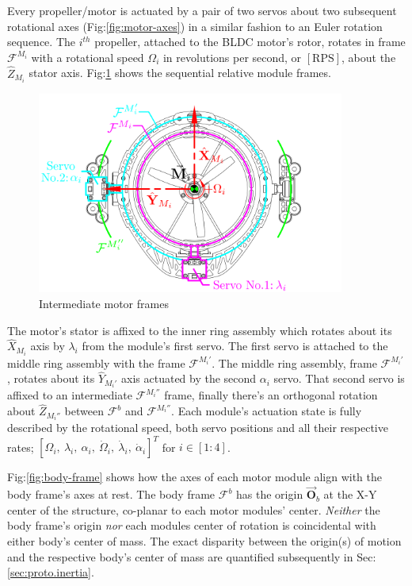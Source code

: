 Every propeller/motor is actuated by a pair of two servos about two subsequent rotational axes (Fig:\ref{fig:motor-axes}) in a similar fashion to an Euler rotation sequence. The $i^{th}$ propeller, attached to the BLDC motor's rotor, rotates in frame $\mathcal{F}^{M_i}$ with a rotational speed $\Omega_i$ in revolutions per second, or $[\text{RPS}]$, about the $\hat{Z}_{M_i}$ stator axis. Fig:\ref{fig:motor-frame} shows the sequential relative module frames.
\begin{figure}[hbtp]
\vspace{-10pt}
\centering
\includegraphics[width=0.9\textwidth]{figs/motor-frame}
\caption{Intermediate motor frames}
\label{fig:motor-frame}
\vspace{-8pt}
\end{figure}
\par
The motor's stator is affixed to the inner ring assembly which rotates about its $\hat{X}_{M_i}$ axis by $\lambda_i$ from the module's first servo. The first servo is attached to the middle ring assembly with the frame $\mathcal{F}^{M_i'}$. The middle ring assembly, frame $\mathcal{F}^{M_i'}$, rotates about its $\hat{Y}_{M_i'}$ axis actuated by the second $\alpha_i$ servo. That second servo is affixed to an intermediate $\mathcal{F}^{M_i''}$ frame, finally there's an orthogonal rotation about $\hat{Z}_{M_i''}$ between $\mathcal{F}^b$ and $\mathcal{F}^{M_i''}$. Each module's actuation state is fully described by the rotational speed, both servo positions and all their respective rates; $[\Omega_{i},~\lambda_{i},~\alpha_{i},~\dot{\Omega}_i,~\dot{\lambda}_i,~\dot{\alpha}_i]^{T}$ for $i\in [1:4]$. 
\par
Fig:\ref{fig:body-frame} shows how the axes of each motor module align with the body frame's axes at rest. The body frame $\mathcal{F}^b$ has the origin $\vec{\mathbf{O}}_b$ at the X-Y center of the structure, co-planar to each motor modules' center. \emph{Neither} the body frame's origin \emph{nor} each modules center of rotation is coincidental with either body's center of mass. The exact disparity between the origin(s) of motion and the respective body's center of mass are quantified subsequently in Sec:\ref{sec:proto.inertia}. 
